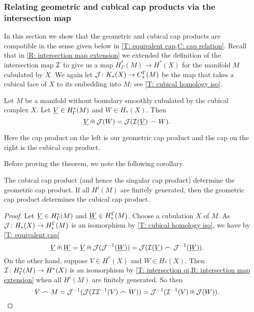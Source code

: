 \subsubsection{Relating geometric and cubical cap products via the intersection map}\label{S: cap product via intersection}

In this section we show that the geometric and cubical cap products are compatible in the sense given below in \cref{T: equivalent cap,C: cap relation}.
Recall that in \cref{R: intersection map extension} we extended the definition of the intersection map $\mathcal{I}$ to give us a map $H^*_\Gamma(M) \to H^*(X)$ for the manifold $M$ cubulated by $X$.
We again let $\mathcal{J} \colon K_*(X) \to C^\Gamma_*(M)$ be the map that takes a cubical face of $X$ to its embedding into $M$; see \cref{T: cubical homology iso}.

\begin{theorem}\label{T: equivalent cap}
	Let $M$ be a manifold without boundary smoothly cubulated by the cubical complex $X$.
	Let $\underline{V} \in H^*_\Gamma(M)$ and $W \in H_*(X )$.
	Then
	$$\underline{V} \nplus \mathcal{J}(W) = \mathcal{J}(\mathcal{I}(\underline{V})\frown W).$$
\end{theorem}

Here the cap product on the left is our geometric cap product and the cap on the right is the cubical cap product.

Before proving the theorem, we note the following corollary.

\begin{corollary}\label{C: cap relation}
	The cubical cap product (and hence the singular cap product) determine the geometric cap product.
	If all $H^i(M)$ are finitely generated, then the geometric cap product determines the cubical cap product.
\end{corollary}

\begin{proof}
	Let $\underline{V} \in H^*_\Gamma(M)$ and $\underline{W} \in H_*^\Gamma(M)$.
	Choose a cubulation $X$ of $M$.
	As $\mathcal{J} \colon H_*(X) \to H_*^\Gamma(M)$ is an isomorphism by \cref{T: cubical homology iso}, we have by \cref{T: equivalent cap}
	$$\underline{V}\nplus \underline{W} = \underline{V}\nplus \mathcal{J}(\mathcal{J}^{-1}(\underline{W})) = \mathcal{J}(\mathcal{I}(\underline{V})\frown \mathcal{J}^{-1}(\underline{W})).$$
	On the other hand, suppose $V \in H^*(X)$ and $W \in H_*(X)$.
	Then $\mathcal{I} \colon H^*_\Gamma(M) \to H^*(X)$ is an isomorphism by \cref{T: intersection qi,R: intersection map extension} when all $H^i(M)$ are finitely generated.
	So then
	$$V\frown M = \mathcal{J}^{-1}(\mathcal{J}(\mathcal{I}\mathcal{I}^{-1}(V)\frown W)) = \mathcal{J}^{-1}(\mathcal{I}^{-1}(V) \nplus \mathcal{J}(W)).$$
\end{proof}

